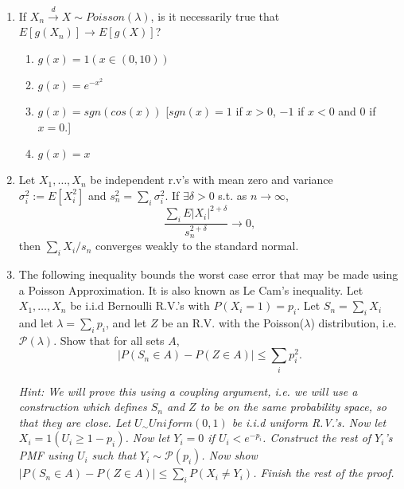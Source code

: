 \documentclass[11pt]{article}
\begin{document}
\begin{enumerate}
\begin{enumerate}
	
\end{enumerate}
\item If $X_n\stackrel{d}{\rightarrow} X\sim Poisson(\lambda)$, is it necessarily true that $E[g(X_n)]\rightarrow E[g(X)]$?
\begin{enumerate}
	\item $g(x)=1(x\in (0,10))$
	\item $g(x)=e^{-x^2}$
	\item $g(x)=sgn(cos(x))$ [$sgn(x)=1$ if $x>0$, $-1$ if $x<0$ and $0$ if $x=0$.]
	\item $g(x)=x$
\end{enumerate}
\item Let $X_1,\dots, X_n$ be independent r.v's with mean zero and variance $\sigma_i^2:=E[X_i^2]$ and $s_n^2=\sum_i\sigma_i^2$. If $\exists\delta>0$ s.t. as $n\rightarrow\infty$,
$$\frac{\sum_i E|X_i|^{2+\delta}}{s_n^{2+\delta}}\rightarrow 0,$$
then $\sum_i X_i/s_n$ converges weakly to the standard normal.
\item The following inequality bounds the worst case error that may be made using a Poisson Approximation. It is also known as Le Cam's inequality. Let $X_1,\dots, X_n$ be i.i.d Bernoulli R.V.'s with $P(X_i=1)=p_i$. Let $S_n=\sum_i X_i$ and let $\lambda=\sum_i p_i$, and let $Z$ be an R.V. with the Poisson($\lambda$) distribution, i.e. $\mathcal{P}(\lambda)$. Show that for all sets $A$,
$$|P(S_n\in A)-P(Z\in A)|\leq \sum_i p_i^2.$$

\textit{Hint: We will prove this using a coupling argument, i.e. we will use a construction which defines $S_n$ and $Z$ to be on the same probability space, so that they are close. Let $U_\sim Uniform(0,1)$ be i.i.d uniform R.V.'s. Now let $X_i=1(U_i\geq 1-p_i)$. Now let $Y_i=0$ if $U_i< e^{-p_i} $. Construct the rest of $Y_i$'s PMF using $U_i$ such that $Y_i\sim \mathcal{P}(p_i)$. Now show $|P(S_n\in A)-P(Z\in A)|\leq \sum_i P(X_i\neq Y_i)$. Finish the rest of the proof.} 
\end{enumerate}
\end{document}
